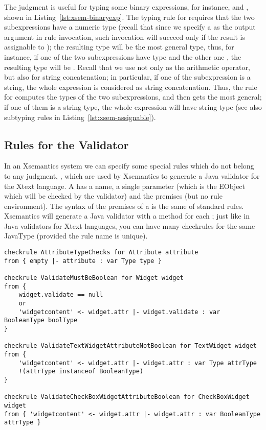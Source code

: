 The judgment  is useful for typing some binary expressions,
for instance,  and , shown in
Listing~\ref{lst:xsem-binaryexp}.  The typing rule for  requires
that the two subexpressions have a numeric type (recall that since we specify a
 as the output argument in rule invocation, such invocation
will succeed only if the result is assignable to ); the
resulting type will be the most general type, thus, for instance, if one of the
two subexpressions have type  and the other one ,
the resulting type will be .  Recall that we use \mytt{+} not
only as the arithmetic operator, but also for string concatenation; in
particular, if one of the subexpression is a string, the whole expression is
considered as string concatenation.  Thus, the rule for  computes the
types of the two subexpressions, and then gets the most general; if one of them
is a string type, the whole expression will have string type (see also subtyping
rules in Listing~\ref{lst:xsem-assignable}).

\subsection{Rules for the Validator}
\label{sec:xsem-validation}

In an Xsemantics system we can specify some special rules which do not belong to
any judgment, , which are used by Xsemantics to generate a Java
validator for the Xtext language.  A  has a name, a single
parameter (which is the EObject which will be checked by the validator) and the
premises (but no rule environment).  The syntax of the premises of a
 is the same of standard rules.
Xsemantics will generate a Java validator with a \checkm{} method for each
; just like in Java validators for Xtext languages, you can have
many checkrules for the same JavaType (provided the rule name is unique).

\begin{lstlisting}[language=xsemantics,float,label=lst:xsem-validator,caption=Some
checkrules for the Validator.] 
checkrule AttributeTypeChecks for Attribute attribute
from { empty |- attribute : var Type type }

checkrule ValidateMustBeBoolean for Widget widget
from {
	widget.validate == null
	or 
	'widgetcontent' <- widget.attr |- widget.validate : var BooleanType boolType
}

checkrule ValidateTextWidgetAttributeNotBoolean for TextWidget widget
from {
	'widgetcontent' <- widget.attr |- widget.attr : var Type attrType
	!(attrType instanceof BooleanType)
}

checkrule ValidateCheckBoxWidgetAttributeBoolean for CheckBoxWidget widget
from { 'widgetcontent' <- widget.attr |- widget.attr : var BooleanType attrType }
\end{lstlisting}

